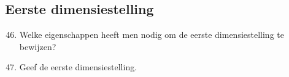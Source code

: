 \documentclass[12pt]{article}
\begin{document}
    \subsection{Eerste dimensiestelling}
    \begin{enumerate}
        \setcounter{enumi}{45}
        \item Welke eigenschappen heeft men nodig om de eerste dimensiestelling te bewijzen?
        \item Geef de eerste dimensiestelling.
    \end{enumerate}
\end{document}
